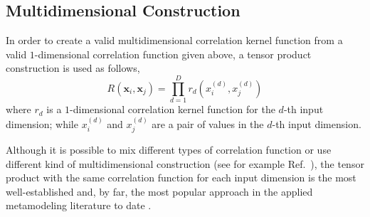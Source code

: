 \subsection{Multidimensional Construction}\label{sub:gp_multidimension}

In order to create a valid multidimensional correlation kernel 
function from a valid $1$-dimensional correlation function given above, a tensor product construction is used as follows,
\begin{equation}
	R(\bm{x}_i, \bm{x}_j) = \prod_{d = 1}^{D} r_d \left(x_i^{(d)}, x_j^{(d)}\right)
\label{eq:tensor_product}
\end{equation}
where $r_d$ is a $1$-dimensional correlation kernel function for the $d$-th input dimension;
while $x_i^{(d)}$ and $x_j^{(d)}$ are a pair of values in the $d$-th input dimension.

Although it is possible to mix different types of correlation function or use different kind of multidimensional construction (see for example Ref.~\cite{Higdon2002}),
the tensor product with the same correlation function for each input dimension is the most well-established 
and, by far, the most popular approach in the applied metamodeling literature to date \cite{Roustant2012,Sacks1989,Sacks1989a,Santner2003,Currin1991,Marrel2008,Bachoc2014,Kennedy2006,Jones2009}.

